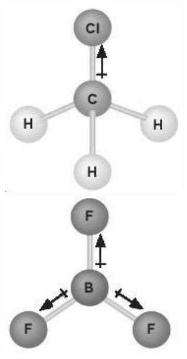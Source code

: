 \documentclass[10pt]{article}
\begin{document}
\includegraphics[max width=\textwidth, center]{2025_10_23_883c4b146e2332109fcdg-32(3)}\\
\includegraphics[max width=\textwidth, center]{2025_10_23_883c4b146e2332109fcdg-32}\\
\end{document}
